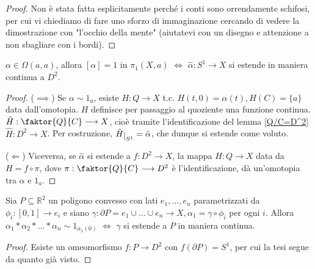 \begin{proof}
  Non è stata fatta esplicitamente perché i conti sono orrendamente schifosi, per cui vi chiediamo di fare uno sforzo di immaginazione cercando di vedere la dimostrazione con "l'occhio della mente" (aiutatevi con un disegno e attenzione a non sbagliare con i bordi).
\end{proof}

\begin{prop}
  $\alpha \in \Omega(a, a)$, allora $[\alpha]=1$ in $\pi_1(X, a)$ $\Leftrightarrow$ $\hat{\alpha}: S^1 \longrightarrow X$ si estende in maniera continua a $D^2$.
\end{prop}

\begin{proof}
  ($\implies$) Se $\alpha \sim 1_a$, esiste $H:Q \longrightarrow X$ t.c. $H(t, 0)=\alpha(t), H(C)=\{a\}$ data dall'omotopia. $H$ definisce per passaggio al quoziente una funzione continua. $\hat{H}: \faktor{Q}{C} \longrightarrow X$, cioè tramite l'identificazione del lemma \ref{Q/C=D^2} $\hat{H}: D^2 \longrightarrow X$. Per costruzione,
  $\hat{H} \restrict{S^1}=\hat{\alpha}$, che dunque si estende come voluto.

  ($\Leftarrow$) Viceversa, se $\hat{\alpha}$ si estende a $f:D^2 \longrightarrow X$, la mappa $H: Q \longrightarrow X$ data da $H=f \circ \pi$, dove $\pi: \faktor{Q}{C} \longrightarrow D^2$ è l'identificazione, dà un'omotopia tra $\alpha$ e $1_a$.
\end{proof}

\begin{cor} \label{pol_est}
  Sia $P \subseteq \mathbb{R}^2$ un poligono convesso con lati $e_1, \dots, e_n$ parametrizzati da $\phi_i: [0, 1] \longrightarrow e_i$ e siano $\gamma: \partial P=e_1 \cup \dots \cup e_n \longrightarrow X, \alpha_1=\gamma \circ \phi_i$ per ogni $i$. Allora
  $\alpha_1 * \alpha_2 * \dots * \alpha_n \sim 1_{\alpha_1(0)}$ $\Leftrightarrow$ $\gamma$ si estende a $P$ in maniera continua.
\end{cor}

\begin{proof}
  Esiste un omeomorfismo $f: P \longrightarrow D^2$ con $f(\partial P)=S^1$, per cui la tesi segue da quanto già visto.
\end{proof}
